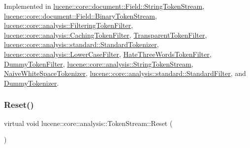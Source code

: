 Implemented in \mbox{\hyperlink{classlucene_1_1core_1_1document_1_1Field_1_1StringTokenStream_a161893ca5de24e392426fea5999334fb}{lucene\+::core\+::document\+::\+Field\+::\+String\+Token\+Stream}}, \mbox{\hyperlink{classlucene_1_1core_1_1document_1_1Field_1_1BinaryTokenStream_a98dee5401b26bdaab935f66a37abae29}{lucene\+::core\+::document\+::\+Field\+::\+Binary\+Token\+Stream}}, \mbox{\hyperlink{classlucene_1_1core_1_1analysis_1_1FilteringTokenFilter_aa1956aa94779023b3f97b667bd819734}{lucene\+::core\+::analysis\+::\+Filtering\+Token\+Filter}}, \mbox{\hyperlink{classlucene_1_1core_1_1analysis_1_1CachingTokenFilter_acea0a0a5ee61ab8831209c96fde49dc8}{lucene\+::core\+::analysis\+::\+Caching\+Token\+Filter}}, \mbox{\hyperlink{classTransparentTokenFilter_ae0bc79516b4f3fae3af29a9d05b4acf6}{Transparent\+Token\+Filter}}, \mbox{\hyperlink{classlucene_1_1core_1_1analysis_1_1standard_1_1StandardTokenizer_a5702119d01489ede9396db0794a98c41}{lucene\+::core\+::analysis\+::standard\+::\+Standard\+Tokenizer}}, \mbox{\hyperlink{classlucene_1_1core_1_1analysis_1_1LowerCaseFilter_a0e32bf7c330bccfb7ad3c68a374683a7}{lucene\+::core\+::analysis\+::\+Lower\+Case\+Filter}}, \mbox{\hyperlink{classHateThreeWordsTokenFilter_ad843fcf23da10776311702c619c02560}{Hate\+Three\+Words\+Token\+Filter}}, \mbox{\hyperlink{classDummyTokenFilter_a6a57ec2684cc58f61ec807bbebabae63}{Dummy\+Token\+Filter}}, \mbox{\hyperlink{classlucene_1_1core_1_1analysis_1_1StringTokenStream_a059da09c86bcf50a286803cad1b99d10}{lucene\+::core\+::analysis\+::\+String\+Token\+Stream}}, \mbox{\hyperlink{classNaiveWhiteSpaceTokenizer_aa1dcc35eedacdb6107441cb9010d60b0}{Naive\+White\+Space\+Tokenizer}}, \mbox{\hyperlink{classlucene_1_1core_1_1analysis_1_1standard_1_1StandardFilter_a11958d89cb4aed281d083db7be0e8680}{lucene\+::core\+::analysis\+::standard\+::\+Standard\+Filter}}, and \mbox{\hyperlink{classDummyTokenizer_a11402de15d04027b30ce918814e1723d}{Dummy\+Tokenizer}}.

\mbox{\label{classlucene_1_1core_1_1analysis_1_1TokenStream_ae24622f4bc0aeaf0bef924ff1661e023}} 
\subsubsection{\texorpdfstring{Reset()}{Reset()}}
{\footnotesize\ttfamily virtual void lucene\+::core\+::analysis\+::\+Token\+Stream\+::\+Reset (\begin{DoxyParamCaption}{ }\end{DoxyParamCaption})\hspace{0.3cm}{\ttfamily [pure virtual]}}



